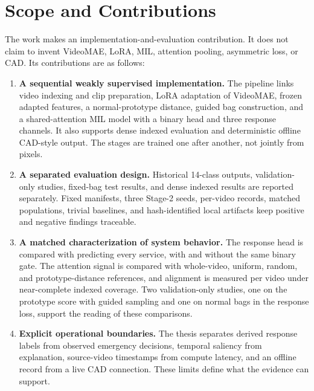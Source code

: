 \section{Scope and Contributions}
\label{sec:introduction-contributions}

The work makes an implementation-and-evaluation contribution. It does not claim
to invent VideoMAE, LoRA, MIL, attention pooling, asymmetric loss, or CAD. Its
contributions are as follows:

\begin{enumerate}
    \item \textbf{A sequential weakly supervised implementation.} The pipeline
    links video indexing and clip preparation, LoRA adaptation of VideoMAE,
    frozen adapted features, a normal-prototype distance, guided bag
    construction, and a shared-attention MIL model with a binary head and three
    response channels. It also supports dense indexed evaluation and
    deterministic offline CAD-style output. The stages are trained one after
    another, not jointly from pixels.

    \item \textbf{A separated evaluation design.} Historical 14-class outputs,
    validation-only studies, fixed-bag test results, and dense indexed results
    are reported separately. Fixed manifests, three Stage-2 seeds, per-video
    records, matched populations, trivial baselines, and hash-identified local
    artifacts keep positive and negative findings traceable.

    \item \textbf{A matched characterization of system behavior.} The response
    head is compared with predicting every service, with and without the same
    binary gate. The attention signal is compared with whole-video, uniform,
    random, and prototype-distance references, and alignment is measured per
    video under near-complete indexed coverage. Two validation-only studies, one
    on the prototype score with guided sampling and one on normal bags in the
    response loss, support the reading of these comparisons.

    \item \textbf{Explicit operational boundaries.} The thesis separates
    derived response labels from observed emergency decisions, temporal saliency
    from explanation, source-video timestamps from compute latency, and an
    offline record from a live CAD connection. These limits define what the
    evidence can support.
\end{enumerate}

